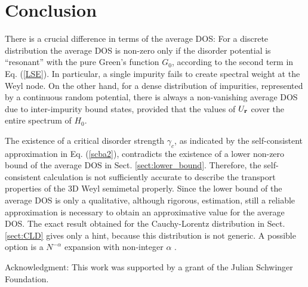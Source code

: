 \documentclass[aps]{revtex4}
\def\br{{\bf r}}
\begin{document}
\section{Conclusion}

There is a crucial difference in terms of the average DOS: For a discrete distribution
the average DOS is non-zero only if the disorder potential is ``resonant'' with the
pure Green's function $G_0$, according to the second term in Eq. (\ref{LSE}). In particular,
a single impurity fails to create spectral weight at the Weyl node.
On the other hand, for a dense distribution of impurities, represented by a continuous random potential, 
there is always a non-vanishing average DOS due to inter-impurity bound states, provided that the values 
of $U_\br$ cover the entire spectrum of $H_0$. 
  
The existence of a critical disorder strength $\gamma_c$, as indicated by the self-consistent
approximation in Eq. (\ref{scba2}), contradicts the existence of a lower non-zero bound of 
the average DOS in Sect. \ref{sect:lower_bound}. Therefore, the self-consistent calculation
is not sufficiently accurate to describe the transport properties of the 3D Weyl semimetal
properly. Since the lower bound of the average DOS is only a qualitative, although rigorous, estimation, 
still a reliable approximation is necessary to obtain an approximative value for the
average DOS. The exact result obtained for the Cauchy-Lorentz distribution in Sect.
\ref{sect:CLD} gives only a hint, because this distribution is not generic. A possible
option is a $N^{-\alpha}$ expansion with non-integer $\alpha$ \cite{ziegler83}.  
 

\vskip0.3cm

Acknowledgment: This work was supported by a grant of the Julian Schwinger Foundation.
\end{document}
